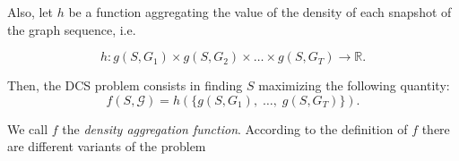 Also, let $h$ be a function aggregating the value of the density of
each snapshot of the graph sequence, i.e.\

\begin{equation*}
	h: g(S, G_1) \times g(S, G_2) \times \dots \times g(S, G_T) \rightarrow
	\mathbb{R}.
\end{equation*}

Then, the \acrshort{DCS} problem consists in finding $S$ maximizing the
following quantity:
\begin{equation*}
	f(S, \mathcal{G} ) = h(\{g(S, G_1 ), \; \dots, \; g(S, G_T) \}).
\end{equation*}

We call $f$ the \emph{density aggregation function}. According to the
definition of $f$ there are different variants
of the problem

